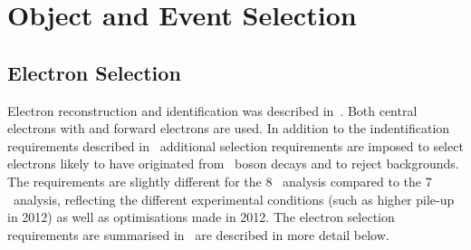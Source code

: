 \graphicspath{{Chapters/ObjEventSelection/Figures/}}
\chapter{Object and Event Selection}
\label{chap:ObjEventSelection}

\section{Electron Selection}
\label{sec:objsel-el}

Electron reconstruction and identification was described in~. Both
central electrons with  and forward electrons are used. In
addition to the indentification requirements described in~
additional selection requirements are imposed to select electrons likely to have
originated from \Z\ boson decays and to reject backgrounds. The requirements are
slightly different for the 8 \tev\ analysis compared to the 7 \tev\ analysis,
reflecting the different experimental conditions (such as higher pile-up in
2012) as well as optimisations made in 2012. The electron selection requirements
are summarised in~ are described in more detail below. 

